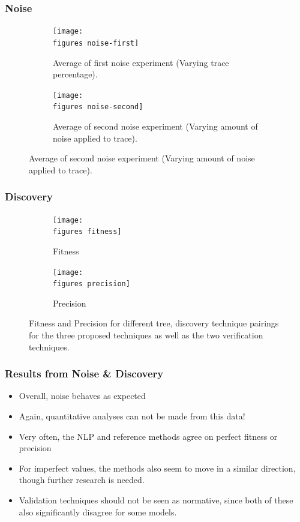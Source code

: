 \documentclass{beamer}
\newcommand{\figures}{../figures/}
\begin{document}
	\begin{frame}
		\frametitle{Noise}
		\begin{figure}
			\centering
			\begin{subfigure}[b]{0.49\textwidth}
				\centering
				\texttt{[image: \\figures noise-first]}
				\caption{Average of first noise experiment (Varying trace percentage).}
				\label{fig:noise-first}
			\end{subfigure}
			\hfill
			\begin{subfigure}[b]{0.49\textwidth}
				\centering
				\texttt{[image: \\figures noise-second]}
				\caption{Average of second noise experiment (Varying amount of noise applied to trace).}
				\label{fig:noise-second}
			\end{subfigure}
		\end{figure}
	\end{frame}
	
	
	\begin{frame}
		\frametitle{Discovery}
		\begin{figure}
			\centering
			\begin{subfigure}[b]{0.49\textwidth}
				\centering
				\texttt{[image: \\figures fitness]}
				\caption{Fitness}
				\label{fig:fitness}
			\end{subfigure}
			\hfill
			\begin{subfigure}[b]{0.49\textwidth}
				\centering
				\texttt{[image: \\figures precision]}
				\caption{Precision}
				\label{fig:precision}
			\end{subfigure}
			\caption{Fitness and Precision for different tree, discovery technique pairings for the three proposed techniques as well as the two verification techniques.}
			\label{fig:discovery}
		\end{figure}
	\end{frame}
	
	\begin{frame}
		\frametitle{Results from Noise \& Discovery}
		\begin{itemize}
			\item Overall, noise behaves as expected
			\item Again, quantitative analyses can not be made from this data!
			\item Very often, the NLP and reference methods agree on perfect fitness or precision
			\item For imperfect values, the methods also seem to move in a similar direction, though further research is needed.
			\item Validation techniques should not be seen as normative, since both of these also significantly disagree for some models. 
		\end{itemize}
	\end{frame}
	
\end{document}
